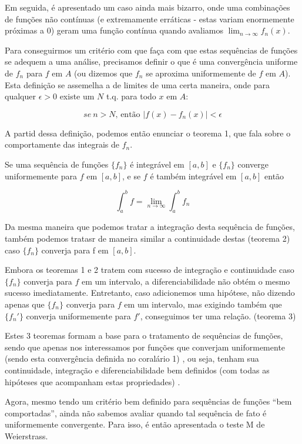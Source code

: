 \documentclass[a4paper, 12pt]{article}
\begin{document}
Em seguida, é apresentado um caso ainda mais bizarro, onde uma combinações de funções não contínuas
(e extremamente erráticas - estas variam enormemente próximas a $0$) geram uma função contínua quando
avaliamos $\lim_{n \to \infty} f_n(x)$.

Para conseguirmos um critério com que faça com que estas sequências de funções se adequem a 
uma análise, precisamos definir o que é uma convergência uniforme de $f_n$ para $f$ em $A$ 
(ou dizemos que $f_n$ se aproxima uniformemente de $f$ em $A$). Esta definição se assemelha a de 
limites de uma certa maneira, onde para qualquer $\epsilon >0$ existe um $N$ t.q. para todo
$x$ em $A$:

\begin{equation}
	\nonumber se \ n > N \text{, então } |f(x) - f_n(x)| < \epsilon
\end{equation} 

A partid dessa definição, podemos então enunciar o teorema 1, que fala sobre o comportamente das 
integrais de $f_n$.

Se uma sequência de funções $\{f_n\}$ é integrável em $[a,b]$ e $\{f_n\}$ converge uniformemente para
$f$ em $[a,b]$, e se $f$ é também integrável em $[a,b]$ então

\begin{equation}
	\nonumber \int_a^b f = \lim_{n\to\infty} \int_a^b f_n
\end{equation}

Da mesma maneira que podemos tratar a integração desta sequência de funções, também podemos tratasr
de maneira similar a continuidade destas (teorema 2) caso $\{f_n\}$ converja para f em $[a,b]$.

Embora os teoremas 1 e 2 tratem com sucesso de integração e continuidade caso $\{f_n\}$ converja
para $f$ em um intervalo, a diferenciabilidade não obtém o mesmo sucesso imediatamente.
Entretanto, caso adicionemos uma hipótese, não dizendo apenas que $\{f_n\}$ converja
para $f$ em um intervalo, mas exigindo também que $\{f_n'\}$ converja uniformemente para $f'$, 
conseguimos ter uma relação. (teorema 3)

Estes 3 teoremas formam a base para o tratamento de sequências de funções, sendo que apenas nos
interessamos por funções que converjam uniformemente (sendo esta convergência definida no coralário 1)
, ou seja, tenham sua continuidade, integração e diferenciabilidade bem definidos (com todas as hipóteses que acompanham estas propriedades)
.

Agora, mesmo tendo um critério bem definido para sequências de funções ``bem comportadas'', ainda não 
sabemos avaliar quando tal sequência de fato é uniformemente convergente. Para isso, é então apresentada
o teste M de Weierstrass. 
\end{document}

